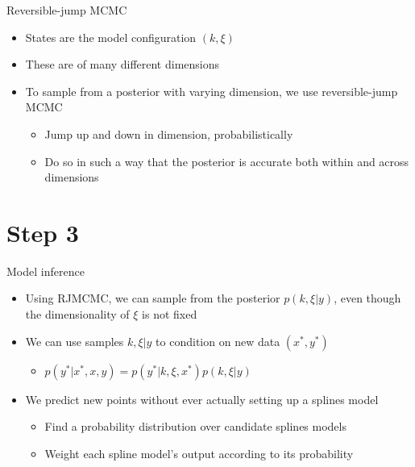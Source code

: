 \documentclass[presentation]{beamer}
\begin{document}
\begin{frame}[label={sec:org1f668c7}]{Reversible-jump MCMC}
\begin{itemize}
\item States are the model configuration \((k, \xi)\)
\item These are of many different dimensions
\item To sample from a posterior with varying dimension, we use reversible-jump MCMC
\begin{itemize}
\item Jump up and down in dimension, probabilistically
\item Do so in such a way that the posterior is accurate both within and across dimensions
\end{itemize}
\end{itemize}
\end{frame}

\section{Step 3}
\label{sec:org6c7da0f}
\begin{frame}[label={sec:org49c736d}]{Model inference}
\begin{itemize}
\item Using RJMCMC, we can sample from the posterior \(p(k, \xi | y)\), even though the dimensionality of \(\xi\) is not fixed
\item We can use samples \(k, \xi | y\) to condition on new data \((x^*, y^*)\)
\begin{itemize}
\item \(p(y^* | x^*, x, y) = p(y^*|k, \xi, x^*)p(k, \xi|y)\)
\end{itemize}
\end{itemize}
\vfill
\begin{itemize}
\item We predict new points without ever actually setting up a splines model
\begin{itemize}
\item Find a probability distribution over candidate splines models
\item Weight each spline model's output according to its probability
\end{itemize}
\end{itemize}
\end{frame}
\end{document}
